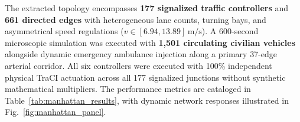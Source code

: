 The extracted topology encompasses \textbf{177 signalized traffic controllers} and \textbf{661 directed edges} with heterogeneous lane counts, turning bays, and asymmetrical speed regulations ($v \in [6.94, 13.89]\,\text{m/s}$). A 600-second microscopic simulation was executed with \textbf{1,501 circulating civilian vehicles} alongside dynamic emergency ambulance injection along a primary 37-edge arterial corridor. All six controllers were executed with 100\% independent physical TraCI actuation across all 177 signalized junctions without synthetic mathematical multipliers. The performance metrics are cataloged in Table~\ref{tab:manhattan_results}, with dynamic network responses illustrated in Fig.~\ref{fig:manhattan_panel}.

\begin{table}[t]
\centering
\caption{Empirical Benchmark on Real-World Midtown Manhattan Network (177 Signalized Intersections, 661 Edges, 1,501 Vehicles)}
\label{tab:manhattan_results}
\end{table}

